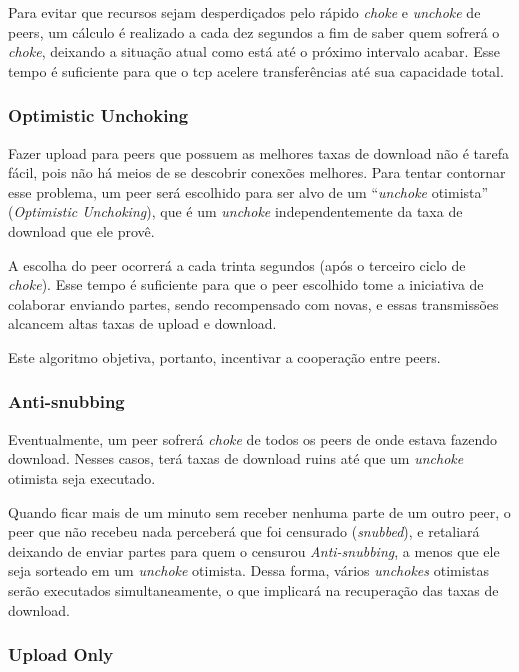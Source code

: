 Para evitar que recursos sejam desperdiçados pelo rápido \emph{choke} e \emph{unchoke}
de \glspl*{peer}, um cálculo é realizado a cada dez segundos a fim de saber quem
sofrerá o \emph{choke}, deixando a situação atual como está até o próximo intervalo
acabar. Esse tempo é suficiente para que o \gls*{tcp} acelere transferências até sua
capacidade total.

\subsubsection*{Optimistic Unchoking}

Fazer upload para \glspl*{peer} que possuem as melhores taxas de download não é tarefa
fácil, pois não há meios de se descobrir conexões melhores. Para tentar contornar esse
problema, um \gls*{peer} será escolhido para ser alvo de um ``\emph{unchoke} otimista''
(\emph{Optimistic Unchoking}), que é um \emph{unchoke} independentemente da taxa de
download que ele provê.

A escolha do \gls*{peer} ocorrerá a cada trinta segundos (após o terceiro ciclo de
\emph{choke}). Esse tempo é suficiente para que o \gls*{peer} escolhido tome a
iniciativa de colaborar enviando partes, sendo recompensado com novas, e essas
transmissões alcancem altas taxas de upload e download.

Este algoritmo objetiva, portanto, incentivar a cooperação entre \glspl*{peer}.

\subsubsection*{Anti-snubbing}

Eventualmente, um \gls*{peer} sofrerá \emph{choke} de todos os \glspl*{peer} de onde
estava fazendo download. Nesses casos, terá taxas de download ruins até que um
\emph{unchoke} otimista seja executado.

Quando ficar mais de um minuto sem receber nenhuma parte de um outro \gls*{peer}, o
\gls*{peer} que não recebeu nada perceberá que foi censurado (\emph{snubbed}), e
retaliará deixando de enviar partes para quem o censurou \emph{Anti-snubbing}, a menos
que ele seja sorteado em um \emph{unchoke} otimista. Dessa forma, vários \emph{unchokes}
otimistas serão executados simultaneamente, o que implicará na recuperação das taxas de
download.

\subsubsection*{Upload Only}

